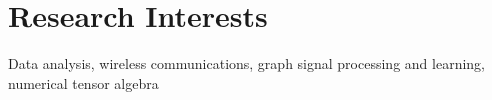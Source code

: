 \section{Research Interests}

Data analysis, wireless communications, graph signal processing and learning, numerical tensor algebra
